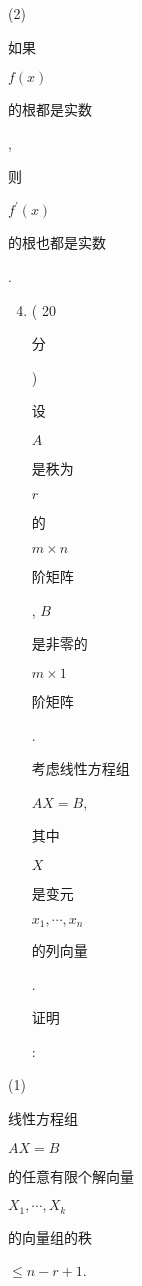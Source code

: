 \documentclass[10pt]{article}
\begin{document}
(2) \begin{CJK}{UTF8}{mj}如果\end{CJK} $f(x)$ \begin{CJK}{UTF8}{mj}的根都是实数\end{CJK}, \begin{CJK}{UTF8}{mj}则\end{CJK} $f^{\prime}(x)$ \begin{CJK}{UTF8}{mj}的根也都是实数\end{CJK}.

\begin{enumerate}
  \setcounter{enumi}{3}
  \item ( 20 \begin{CJK}{UTF8}{mj}分\end{CJK}) \begin{CJK}{UTF8}{mj}设\end{CJK} $A$ \begin{CJK}{UTF8}{mj}是秩为\end{CJK} $r$ \begin{CJK}{UTF8}{mj}的\end{CJK} $m \times n$ \begin{CJK}{UTF8}{mj}阶矩阵\end{CJK}, $B$ \begin{CJK}{UTF8}{mj}是非零的\end{CJK} $m \times 1$ \begin{CJK}{UTF8}{mj}阶矩阵\end{CJK}. \begin{CJK}{UTF8}{mj}考虑线性方程组\end{CJK} $A X=B$, \begin{CJK}{UTF8}{mj}其中\end{CJK} $X$ \begin{CJK}{UTF8}{mj}是变元\end{CJK} $x_{1}, \cdots, x_{n}$ \begin{CJK}{UTF8}{mj}的列向量\end{CJK}. \begin{CJK}{UTF8}{mj}证明\end{CJK}:
\end{enumerate}
(1) \begin{CJK}{UTF8}{mj}线性方程组\end{CJK} $A X=B$ \begin{CJK}{UTF8}{mj}的任意有限个解向量\end{CJK} $X_{1}, \cdots, X_{k}$ \begin{CJK}{UTF8}{mj}的向量组的秩\end{CJK} $\leqslant n-r+1$.
\end{document}
